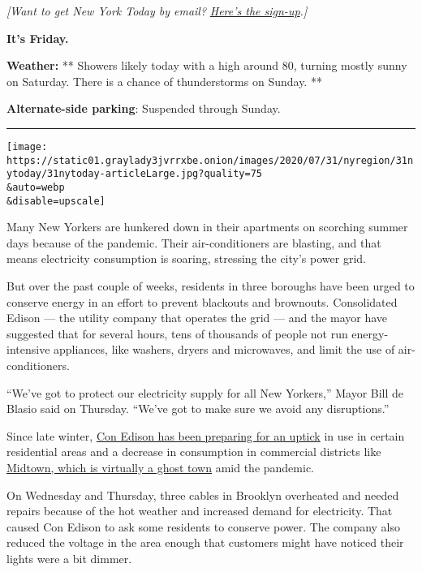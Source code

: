\emph{{[}Want to get New York Today by email?}
\href{https://www.nytimes3xbfgragh.onion/newsletters/newyorktoday}{\emph{Here's
the sign-up}}\emph{.{]}}

\textbf{It's Friday.}

\textbf{Weather:} ** Showers likely today with a high around 80, turning
mostly sunny on Saturday. There is a chance of thunderstorms on Sunday.
**

\textbf{Alternate-side parking}: Suspended through Sunday.

\begin{center}\rule{0.5\linewidth}{\linethickness}\end{center}

\texttt{[image: https://static01.graylady3jvrrxbe.onion/images/2020/07/31/nyregion/31nytoday/31nytoday-articleLarge.jpg?quality=75\\\&auto=webp\\\&disable=upscale]}

Many New Yorkers are hunkered down in their apartments on scorching
summer days because of the pandemic. Their air-conditioners are
blasting, and that means electricity consumption is soaring, stressing
the city's power grid.

But over the past couple of weeks, residents in three boroughs have been
urged to conserve energy in an effort to prevent blackouts and
brownouts. Consolidated Edison --- the utility company that operates the
grid --- and the mayor have suggested that for several hours, tens of
thousands of people not run energy-intensive appliances, like washers,
dryers and microwaves, and limit the use of air-conditioners.

``We've got to protect our electricity supply for all New Yorkers,''
Mayor Bill de Blasio said on Thursday. ``We've got to make sure we avoid
any disruptions.''

Since late winter,
\href{https://www.coned.com/en/about-us/media-center/news/20200520/con-edison-invests-for-summer-2020-and-new-yorks-clean-energy-future}{Con
Edison has been preparing for an uptick} in use in certain residential
areas and a decrease in consumption in commercial districts like
\href{https://www.nytimes3xbfgragh.onion/2020/07/26/nyregion/nyc-coronavirus-time-life-building.html}{Midtown,
which is virtually a ghost town} amid the pandemic.

On Wednesday and Thursday, three cables in Brooklyn overheated and
needed repairs because of the hot weather and increased demand for
electricity. That caused Con Edison to ask some residents to conserve
power. The company also reduced the voltage in the area enough that
customers might have noticed their lights were a bit dimmer.

